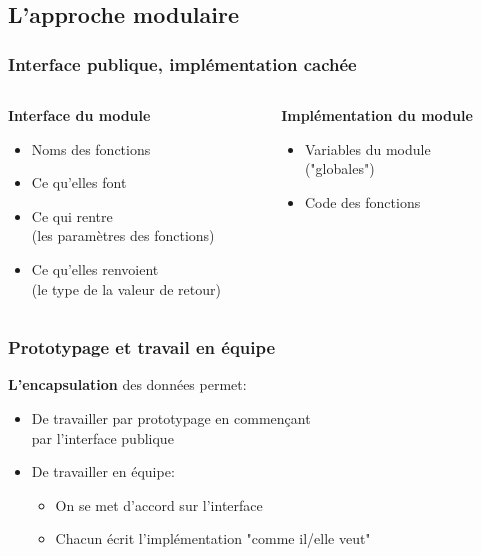 \documentclass{beamer}
\begin{document}
  \subsection{L'approche modulaire}
  \begin{frame}
  \frametitle {Interface publique, implémentation cachée}

  \begin{columns}[t]

  \begin{column}{6cm}
  \textbf{Interface du module}
  \begin{itemize}
    \item{Noms des fonctions}
    \item{Ce qu'elles font}
    \item{Ce qui rentre \\ (les paramètres des fonctions)}
    \item{Ce qu'elles renvoient \\ (le type de la valeur de retour)}
  \end{itemize}
  \end{column}

  \begin{column}{6cm}
  \textbf{Implémentation du module}
  \begin{itemize}
     \item{Variables du module \\ ("globales")}
     \item{Code des fonctions}
  \end{itemize}
  \end{column}

  \end{columns}

  \end{frame}
  
  \begin{frame}
  \frametitle {Prototypage et travail en équipe}
  \textbf{L'encapsulation} des données permet:
    \begin{itemize}
    \item De travailler \alert{par prototypage} en commençant \\ par l'interface publique
    \item De travailler en équipe:
    \begin{itemize}
    \item On se met d'accord \alert{sur l'interface}
    \item Chacun écrit l'implémentation \alert{"comme il/elle veut"}
    \end{itemize}
    \end{itemize}
  \end{frame}
\end{document}
